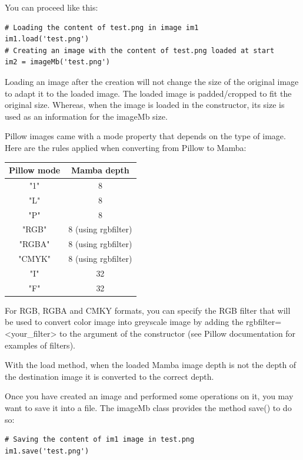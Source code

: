 \documentclass[a4paper,10pt,oneside]{article}
\begin{document}
You can proceed like this:

\lstset{language=Python}
\begin{lstlisting}
# Loading the content of test.png in image im1
im1.load('test.png')
# Creating an image with the content of test.png loaded at start
im2 = imageMb('test.png')
\end{lstlisting}

Loading an image after the creation will not change the size of the original 
image to adapt it to the loaded image. The loaded image is padded/cropped to fit
the original size. Whereas, when the image is loaded in the constructor, its size
is used as an information for the imageMb size.

Pillow images came with a mode property that depends on the type of image.
Here are the rules applied when converting from Pillow to Mamba:

\begin{center}
\begin{tabular}{|c|c|}
  \hline
  Pillow mode & Mamba depth \\
  \hline
  "1" & 8\\
  "L" & 8\\
  "P" & 8\\
  "RGB" & 8 (using rgbfilter)\\
  "RGBA" & 8 (using rgbfilter)\\
  "CMYK" & 8 (using rgbfilter)\\
  "I" & 32\\ 
  "F" & 32\\
  \hline
\end{tabular}
\end{center}

For RGB, RGBA and CMKY formats, you can specify the RGB filter that will be
used to convert color image into greyscale image by adding the
rgbfilter=<your\_filter> to the argument of the constructor (see Pillow
documentation for examples of filters).

With the load method, when the loaded Mamba image depth is not the depth
of the destination image it is converted to the correct depth.

Once you have created an image and performed some operations on it, you may want 
to save it into a file. The imageMb class provides the method save() to do so:

\lstset{language=Python}
\begin{lstlisting}
# Saving the content of im1 image in test.png
im1.save('test.png')
\end{lstlisting}
\end{document}
